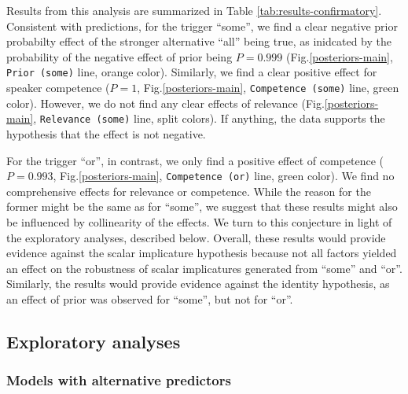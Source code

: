\documentclass{sp}
\begin{document}
Results from this analysis are summarized in Table \ref{tab:results-confirmatory}.
Consistent with predictions, for the trigger ``some'', we find a clear negative prior probabilty effect of the stronger alternative ``all'' being true, as inidcated by the probability of the negative effect of prior being $P = 0.999$ (Fig.\ref{posteriors-main}, \texttt{Prior~(some)} line, orange color). Similarly, we find a clear positive effect for speaker competence ($P =  1$, Fig.\ref{posteriors-main}, \texttt{Competence~(some)} line, green color). However, we do not find any clear effects of relevance (Fig.\ref{posteriors-main}, \texttt{Relevance~(some)} line, split colors). If anything, the data supports the hypothesis that the effect is not negative.


For the trigger ``or'', in contrast, we only find a positive effect of competence ($P =  0.993$, Fig.\ref{posteriors-main}, \texttt{Competence~(or)} line, green color).  We find no comprehensive effects for relevance or competence. While the reason for the former might be the same as for ``some'', we suggest that these results might also be influenced by collinearity of the effects. We turn to this conjecture in light of the exploratory analyses, described below. 
Overall, these results would provide evidence against the scalar implicature hypothesis because not all factors yielded an effect on the robustness of scalar implicatures generated from ``some'' and ``or''. Similarly, the results would provide evidence against the identity hypothesis, as an effect of prior was observed for ``some'', but not for ``or''.

\subsection{Exploratory analyses}

\subsubsection{Models with alternative predictors}
\end{document}
